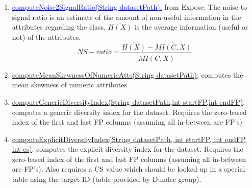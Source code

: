 \documentclass[a4paper,12pt, english]{article}
\begin{document}
\begin{enumerate}
	\item \textcolor{blue}{\underline{computeNoise2SignalRatio(String datasetPath):}} from Expose: The noise to signal ratio is an estimate of the amount of non-useful information in the attributes regarding the class. $\overline{H(X)}$ is the average information (useful or not) of the attributes. \begin{equation} NS-ratio=\frac{\overline{H(X)}-\overline{MI(C,X)}}{\overline{MI(C,X)}} \end{equation} 
	
	\item \underline{computeMeanSkewnessOfNumericAtts(String datasetPath)}:  computes the mean skewness of numeric attributes
	\item \underline{computeGenericDiversityIndex(String datasetPath,int startFP,int endFP)}: computes a generic diversity index for the dataset. Requires the zero-based index of the first and last FP columns (assuming all in-between are FP's)

	\item \underline{computeExplicitDiversityIndex(String datasetPath, int startFP, int endFP, int cs)}: computes the explicit diversity index for the dataset. Requires the zero-based index of the first and last FP columns (assuming all in-between are FP's). Also requires a CS value which should be looked up in a special table using the target ID (table provided by Dundee group).
\end{enumerate}   
\end{document}
